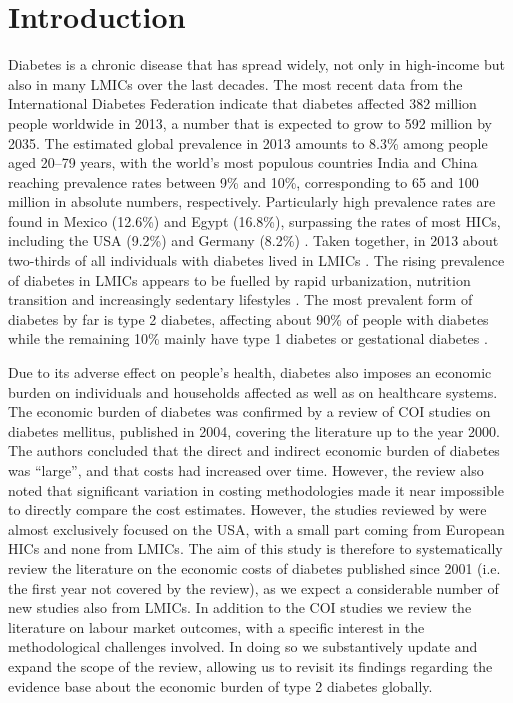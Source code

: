 \section{Introduction}
Diabetes is a chronic disease that has spread widely, not only in high-income but also in many \acp{LMIC} over the last decades. The most recent data from the International Diabetes Federation indicate that diabetes affected 382 million people worldwide in 2013, a number that is expected to grow to 592 million by 2035. The estimated global prevalence in 2013 amounts to 8.3\% among people aged 20--79 years, with the world's most populous countries India and China reaching prevalence rates between 9\% and 10\%, corresponding to 65 and 100 million in absolute numbers, respectively. Particularly high prevalence rates are found in Mexico (12.6\%) and Egypt (16.8\%), surpassing the rates of most \acp{HIC}, including the USA (9.2\%) and Germany (8.2\%) \parencite{InternationalDiabetesFederation2013}. Taken together, in 2013 about two-thirds of all individuals with diabetes lived in \acp{LMIC} \parencite{InternationalDiabetesFederation2013}. The rising prevalence of diabetes in \acp{LMIC} appears to be fuelled by rapid urbanization, nutrition transition and increasingly sedentary lifestyles \parencite{Hu2011}. The most prevalent form of diabetes by far is type 2 diabetes, affecting about 90\% of people with diabetes while the remaining 10\% mainly have type 1 diabetes or gestational diabetes \parencite{InternationalDiabetesFederation2013}.

Due to its adverse effect on people's health, diabetes also imposes an economic burden on individuals and households affected as well as on healthcare systems. The economic burden of diabetes was confirmed by a review of \ac{COI} studies on diabetes mellitus, published in 2004, covering the literature up to the year 2000. The authors concluded that the direct and indirect economic burden of diabetes was ``large'', and that costs had increased over time. However, the review also noted that significant variation in costing methodologies made it near impossible to directly compare the cost estimates. However, the studies reviewed by \textcite{Ettaro2004} were almost exclusively focused on the USA, with a small part coming from European \acp{HIC} and none from \acp{LMIC}. The aim of this study is therefore to systematically review the literature on the economic costs of diabetes published since 2001 (i.e. the first year not covered by the \textcite{Ettaro2004} review), as we expect a considerable number of new studies also from \acp{LMIC}. In addition to the \ac{COI} studies we review the literature on labour market outcomes, with a specific interest in the methodological challenges involved. In doing so we substantively update and expand the scope of the \textcite{Ettaro2004} review, allowing us to revisit its findings regarding the evidence base about the economic burden of type 2 diabetes globally.

